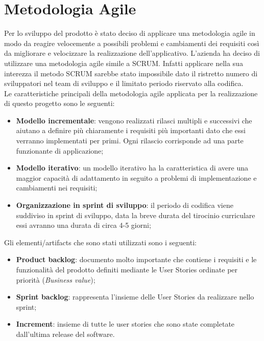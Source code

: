\section{Metodologia Agile}
Per lo sviluppo del prodotto è stato deciso di applicare una metodologia agile in modo da reagire velocemente a possibili problemi e cambiamenti dei requisiti così da migliorare e velocizzare la realizzazione dell'applicativo. L'azienda ha deciso di utilizzare una metodologia agile simile a SCRUM. Infatti applicare nella sua interezza il metodo SCRUM sarebbe stato impossibile dato il ristretto numero di sviluppatori nel team di sviluppo e il limitato periodo riservato alla codifica. \\
Le caratteristiche principali della metodologia agile applicata per la realizzazione di questo progetto sono le seguenti:
\begin{itemize}
	\item \textbf{Modello incrementale}: vengono realizzati rilasci multipli e successivi che aiutano a definire più chiaramente i requisiti più importanti dato che essi verranno implementati per primi. Ogni rilascio corrisponde ad una parte funzionante di applicazione;
	
	\item \textbf{Modello iterativo}: un modello iterativo ha la caratteristica di avere una maggior capacità di adattamento in seguito a problemi di implementazione e cambiamenti nei requisiti;
	
	\item \textbf{Organizzazione in sprint di sviluppo}: il periodo di codifica viene suddiviso in sprint di sviluppo, data la breve durata del tirocinio curriculare essi avranno una durata di circa 4-5 giorni;
\end{itemize}
\noindent
Gli elementi/artifacts che sono stati utilizzati sono i seguenti:
\begin{itemize}
	\item \textbf{Product backlog}: documento molto importante che contiene i requisiti e le funzionalità del prodotto definiti mediante le User Stories ordinate per priorità (\emph{Business value});
	
	\item \textbf{Sprint backlog}: rappresenta l'insieme delle User Stories da realizzare nello sprint;
	
	\item \textbf{Increment}: insieme di tutte le user stories che sono state completate dall'ultima release del software.
\end{itemize}
